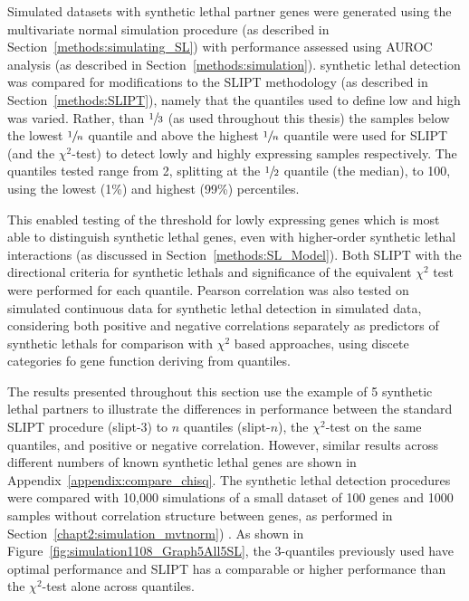 Simulated datasets with \gls{synthetic lethal} partner genes were generated using the multivariate normal simulation procedure (as described in Section~\ref{methods:simulating_SL}) with performance assessed using \gls{AUROC} analysis (as described in Section~\ref{methods:simulation}). \Gls{synthetic lethal} detection was compared for modifications to the \gls{SLIPT} methodology (as described in Section~\ref{methods:SLIPT}), namely that the quantiles used to define low and high  was varied. Rather, than $\sfrac{1}{3}$ (as used throughout this thesis) the samples below the lowest $\sfrac{1}{n}$ quantile and above the highest $\sfrac{1}{n}$ quantile were used for \gls{SLIPT} (and the $\chi^2$-test) to detect lowly and highly expressing samples respectively. The quantiles tested range from 2, splitting at the $\sfrac{1}{2}$ quantile (the median), to 100, using the lowest (1\%) and highest (99\%) percentiles.

This enabled testing of the threshold for lowly expressing genes which is most able to distinguish \gls{synthetic lethal} genes, even with higher-order \gls{synthetic lethal} interactions (as discussed in Section~\ref{methods:SL_Model}). Both \gls{SLIPT} with the directional criteria for \glspl{synthetic lethal} and significance of the equivalent $\chi^2$ test were performed for each quantile. Pearson correlation was also tested on simulated continuous  data for \gls{synthetic lethal} detection in simulated data, considering both positive and negative correlations separately as predictors of \glspl{synthetic lethal} for comparison with $\chi^2$ based approaches, using discete categories fo gene function deriving from quantiles. 

The results presented throughout this section use the example of 5 \gls{synthetic lethal} partners to illustrate the differences in performance between the standard \gls{SLIPT} procedure (slipt-3) to $n$ quantiles (slipt-$n$), the $\chi^2$-test on the same quantiles, and positive or negative correlation. However, similar results across different numbers of known \gls{synthetic lethal} genes are shown in Appendix~\ref{appendix:compare_chisq}. The \gls{synthetic lethal} detection procedures were compared with 10,000 simulations of a small dataset of 100 genes and 1000 samples without correlation structure between genes, as performed in Section~\ref{chapt2:simulation_mvtnorm}) . As shown in Figure~\ref{fig:simulation1108_Graph5All5SL}, the 3-quantiles previously used have optimal performance and \gls{SLIPT} has a comparable or higher performance than the $\chi^2$-test alone across quantiles.

